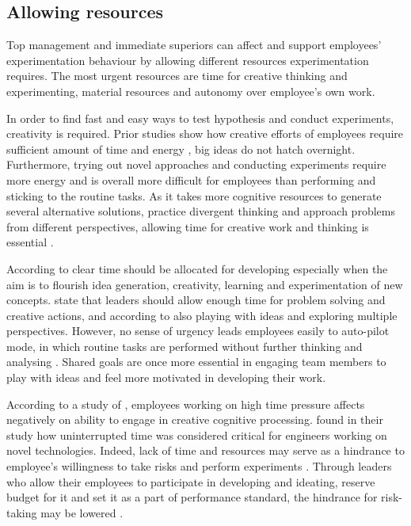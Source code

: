\subsection{Allowing resources}
Top management and immediate superiors can affect and support employees' experimentation behaviour by allowing different resources experimentation requires. The most urgent resources are time for creative thinking and experimenting, material resources and autonomy over employee's own work\citet{amabile2008creativity,katz1985project}. 

In order to find fast and easy ways to test hypothesis and conduct experiments, creativity is required. Prior studies show how creative efforts of employees require sufficient amount of time and energy \citep{gardner1988creativity,getzels1975problem}, big ideas do not hatch overnight. Furthermore, trying out novel approaches and conducting experiments require more energy and is overall more difficult for employees than performing and sticking to the routine tasks. As it takes more cognitive resources to generate several alternative solutions, practice divergent thinking and approach problems from different perspectives, allowing time for creative work and thinking is essential \citep{amabile2002creativity,shalley2004leaders}. 

According to \citet{amabile2002creativity} clear time should be allocated for developing especially when the aim is to flourish idea generation, creativity, learning and experimentation of new concepts. \citet{redmond1993putting} state that leaders should allow enough time for problem solving and creative actions, and according to \citet{amabile1987creativity} also playing with ideas and exploring multiple perspectives. However, no sense of urgency leads employees easily to auto-pilot mode, in which routine tasks are performed without further thinking and analysing \citep{amabile2002creativity}. Shared goals are once more essential in engaging team members to play with ideas and feel more motivated in developing their work. \citep{amabile2002creativity}

According to a study of \citet{amabile2002creativity}, employees working on high time pressure affects negatively on ability to engage in creative cognitive processing.  \citet{katz1985project} found in their study how uninterrupted time was considered critical for engineers working on novel technologies. Indeed, lack of time and resources may serve as a hindrance to employee's willingness to take risks and perform experiments \citep{jung2003role}. Through leaders who allow their employees to participate in developing and ideating, reserve budget for it and set it as a part of performance standard, the hindrance for risk-taking may be lowered \citep{jung2003role}. 
 
